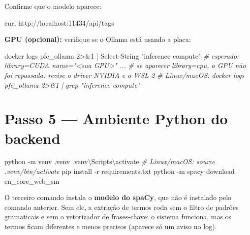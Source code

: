 \documentclass[
  brazilian,
  a4paper,12pt,oneside]{report}
\newenvironment{Shaded}{}{}
\newcommand{\CommentTok}[1]{\textcolor[rgb]{0.38,0.63,0.69}{\textit{#1}}}
\newcommand{\DecValTok}[1]{\textcolor[rgb]{0.25,0.63,0.44}{#1}}
\newcommand{\FunctionTok}[1]{\textcolor[rgb]{0.02,0.16,0.49}{#1}}
\newcommand{\NormalTok}[1]{#1}
\newcommand{\OperatorTok}[1]{\textcolor[rgb]{0.40,0.40,0.40}{#1}}
\newcommand{\StringTok}[1]{\textcolor[rgb]{0.25,0.44,0.63}{#1}}
\begin{document}
Confirme que o modelo aparece:

\begin{Shaded}
\begin{Highlighting}[]
\FunctionTok{curl}\NormalTok{ http}\OperatorTok{://}\NormalTok{localhost}\OperatorTok{:}\DecValTok{11434}\OperatorTok{/}\NormalTok{api}\OperatorTok{/}\NormalTok{tags}
\end{Highlighting}
\end{Shaded}

\textbf{GPU (opcional):} verifique se o Ollama está usando a placa:

\begin{Shaded}
\begin{Highlighting}[]
\NormalTok{docker logs pfc\_ollama }\DecValTok{2}\OperatorTok{\textgreater{}\&}\DecValTok{1} \OperatorTok{|} \FunctionTok{Select{-}String} \StringTok{"inference compute"}
\CommentTok{\# esperado: library=CUDA name="\textless{}sua GPU\textgreater{}" ...}
\CommentTok{\# se aparecer library=cpu, a GPU não foi repassada: revise o driver NVIDIA e o WSL 2}
\CommentTok{\# Linux/macOS: docker logs pfc\_ollama 2\textgreater{}\&1 | grep "inference compute"}
\end{Highlighting}
\end{Shaded}

\section{Passo 5 --- Ambiente Python do
backend}\label{passo-5-ambiente-python-do-backend}

\begin{Shaded}
\begin{Highlighting}[]
\NormalTok{python }\OperatorTok{{-}}\NormalTok{m venv }\OperatorTok{.}\FunctionTok{venv}
\OperatorTok{.}\FunctionTok{venv}\NormalTok{\textbackslash{}Scripts\textbackslash{}activate          }\CommentTok{\# Linux/macOS: source .venv/bin/activate}
\NormalTok{pip install }\OperatorTok{{-}}\NormalTok{r requirements}\OperatorTok{.}\FunctionTok{txt}
\NormalTok{python }\OperatorTok{{-}}\NormalTok{m spacy download en\_core\_web\_sm}
\end{Highlighting}
\end{Shaded}

O terceiro comando instala o \textbf{modelo do spaCy}, que não é
instalado pelo comando anterior. Sem ele, a extração de termos roda sem
o filtro de padrões gramaticais e sem o vetorizador de frases-chave: o
sistema funciona, mas os termos ficam diferentes e menos precisos
(aparece só um aviso no log).
\end{document}

